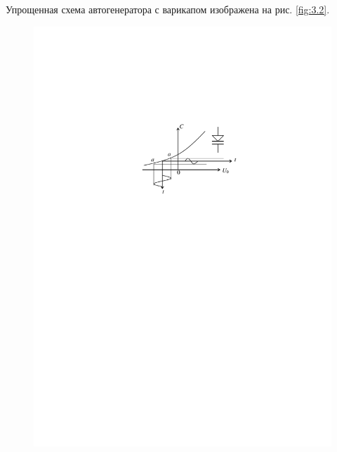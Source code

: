 \documentclass[a4paper,12pt]{article}
\begin{document}
Упрощенная схема автогенератора с варикапом изображена на рис. \ref{fig:3.2}.
\begin{figure}[H]
	\centering
	\includegraphics[]{fig/fig3-1}
	\caption{}
	\label{fig:3.1}
\end{figure}
\end{document}
